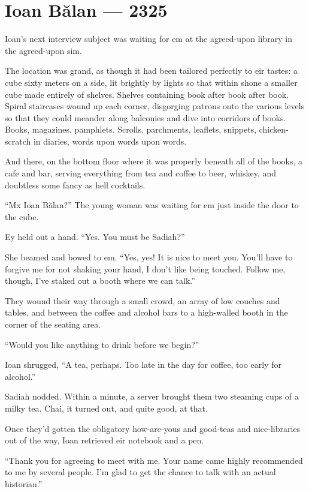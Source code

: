 \hypertarget{ioan-bux103lan-2325}{%
\chapter{Ioan Bălan — 2325}\label{ioan-bux103lan-2325}}

Ioan's next interview subject was waiting for em at the agreed-upon library in the agreed-upon sim.

The location was grand, as though it had been tailored perfectly to eir tastes: a cube sixty meters on a side, lit brightly by lights so that within shone a smaller cube made entirely of shelves. Shelves containing book after book after book. Spiral staircases wound up each corner, disgorging patrons onto the various levels so that they could meander along balconies and dive into corridors of books. Books, magazines, pamphlets. Scrolls, parchments, leaflets, snippets, chicken-scratch in diaries, words upon words upon words.

And there, on the bottom floor where it was properly beneath all of the books, a cafe and bar, serving everything from tea and coffee to beer, whiskey, and doubtless some fancy as hell cocktails.

``Mx Ioan Bălan?'' The young woman was waiting for em just inside the door to the cube.

Ey held out a hand. ``Yes. You must be Sadiah?''

She beamed and bowed to em. ``Yes, yes! It is nice to meet you. You'll have to forgive me for not shaking your hand, I don't like being touched. Follow me, though, I've staked out a booth where we can talk.''

They wound their way through a small crowd, an array of low couches and tables, and between the coffee and alcohol bars to a high-walled booth in the corner of the seating area.

``Would you like anything to drink before we begin?''

Ioan shrugged, ``A tea, perhaps. Too late in the day for coffee, too early for alcohol.''

Sadiah nodded. Within a minute, a server brought them two steaming cups of a milky tea. Chai, it turned out, and quite good, at that.

Once they'd gotten the obligatory how-are-yous and good-teas and nice-libraries out of the way, Ioan retrieved eir notebook and a pen.

``Thank you for agreeing to meet with me. Your name came highly recommended to me by several people. I'm glad to get the chance to talk with an actual historian.''

